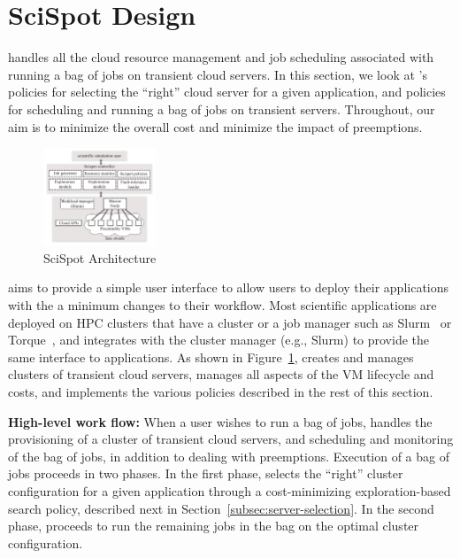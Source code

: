 \section{SciSpot Design}
\label{sec:design}

\sysname handles all the cloud resource management and job scheduling associated with running a bag of jobs on transient cloud servers. 
In this section, we look at \sysname's policies for selecting the ``right'' cloud server for a given application, and policies for scheduling and running a bag of jobs on transient servers.
Throughout, our aim is to minimize the overall cost and minimize the impact of preemptions. 


\begin{figure}[h]
  \includegraphics[width=0.3\textwidth]{../figures/Architecture.png}
  \caption{SciSpot Architecture}
  \label{fig:arch}
\end{figure}

\sysname aims to provide a simple user interface to allow users to deploy their applications with the a minimum changes to their workflow.
Most scientific applications are deployed on HPC clusters that have a cluster or a job manager such as Slurm~\cite{slurm} or Torque~\cite{torque}, and \sysname integrates with the cluster manager (e.g., Slurm) to provide the same interface to applications.
As shown in Figure~\ref{fig:arch}, \sysname creates and manages clusters of transient cloud servers, manages all aspects of the VM lifecycle and costs, and implements the various policies described in the rest of this section. 


\noindent \textbf{High-level work flow:} When a user wishes to run a bag of jobs, \sysname handles the provisioning of a cluster of transient cloud servers, and scheduling and monitoring of the bag of jobs, in addition to dealing with preemptions.
Execution of a bag of jobs proceeds in two phases. In the first phase, \sysname selects the ``right'' cluster configuration for a given application through a cost-minimizing exploration-based search policy, described next in Section~\ref{subsec:server-selection}.
In the second phase, \sysname proceeds to run the remaining jobs in the bag on the optimal cluster configuration. 

